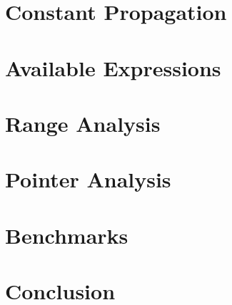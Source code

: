 \documentclass[11pt,twocolumn]{article}
\begin{document}


\section{Constant Propagation}



\section{Available Expressions}



\section{Range Analysis}



\section{Pointer Analysis}



\section{Benchmarks}



\section{Conclusion}


\end{document}
